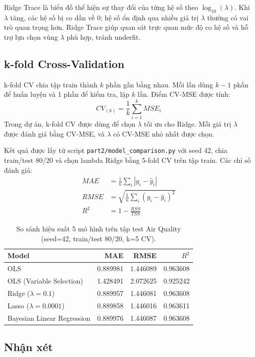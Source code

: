 \documentclass[a4paper]{article}
\begin{document}
Ridge Trace là biểu đồ thể hiện sự thay đổi của từng hệ số theo $\log_{10}(\lambda)$. Khi $\lambda$ tăng, các hệ số bị co dần về 0; hệ số ổn định qua nhiều giá trị $\lambda$ thường có vai trò quan trọng hơn. Ridge Trace giúp quan sát trực quan mức độ co hệ số và hỗ trợ lựa chọn vùng $\lambda$ phù hợp, tránh underfit.

\subsection{k-fold Cross-Validation}
k-fold CV chia tập train thành $k$ phần gần bằng nhau. Mỗi lần dùng $k-1$ phần để huấn luyện và 1 phần để kiểm tra, lặp $k$ lần. Điểm CV-MSE được tính:
\begin{equation}
CV_{(k)} = \frac{1}{k}\sum_{i=1}^{k} MSE_i
\end{equation}
Trong dự án, k-fold CV được dùng để chọn $\lambda$ tối ưu cho Ridge. Mỗi giá trị $\lambda$ được đánh giá bằng CV-MSE, và $\lambda$ có CV-MSE nhỏ nhất được chọn.

Kết quả được lấy từ script \texttt{part2/model\_comparison.py} với seed 42, chia train/test 80/20 và chọn lambda Ridge bằng 5-fold CV trên tập train. Các chỉ số đánh giá:
\begin{align*}
MAE &= \frac{1}{n}\sum_i |y_i-\hat{y}_i| \\
RMSE &= \sqrt{\frac{1}{n}\sum_i (y_i-\hat{y}_i)^2} \\
R^2 &= 1 - \frac{RSS}{TSS}
\end{align*}

\begin{table}[H]
\centering
\begin{tabular}{lrrr}
\hline
Model & MAE & RMSE & $R^2$ \\
\hline
OLS & 0.889981 & 1.446089 & 0.963608 \\
OLS (Variable Selection) & 1.428491 & 2.072625 & 0.925242 \\
Ridge ($\lambda=0.1$) & 0.889957 & 1.446081 & 0.963608 \\
Lasso ($\lambda=0.0001$) & 0.889858 & 1.446016 & 0.963611 \\
Bayesian Linear Regression & 0.889976 & 1.446087 & 0.963608 \\
\hline
\end{tabular}
\caption{So sánh hiệu suất 5 mô hình trên tập test Air Quality (seed=42, train/test 80/20, k=5 CV).}
\end{table}

\subsection{Nhận xét}
\end{document}
